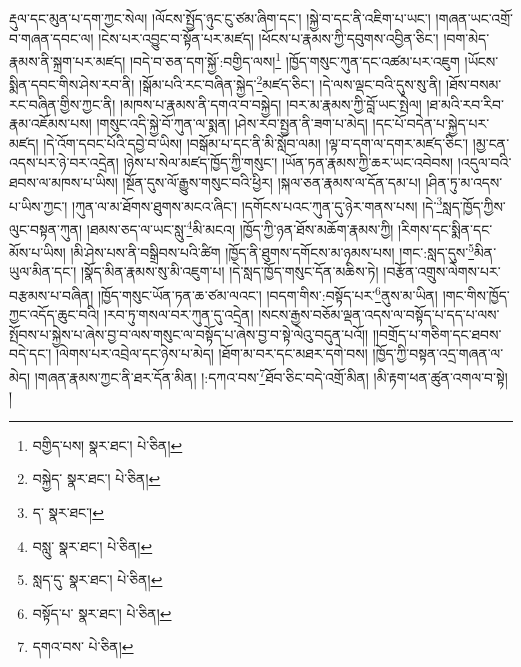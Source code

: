 རྡུལ་དང་མུན་པ་དག་ཀྱང་སེལ། །ལོངས་སྤྱོད་ཉུང་ངུ་ཙམ་ཞིག་དང་། །སྐྱེ་བ་དང་ནི་འཇིག་པ་ཡང་། །གཞན་ཡང་འགྲོ་བ་གཞན་དབང་ལ། །ངེས་པར་འབྱུང་བ་སྟོན་པར་མཛད། །ཕོངས་པ་རྣམས་ཀྱི་དབུགས་འབྱིན་ཅིང་། །བག་མེད་རྣམས་ནི་སྐྲག་པར་མཛད། །བདེ་བ་ཅན་དག་སྐྱོ་:བགྱིད་ལས།\footnote{བགྱིད་པས།  སྣར་ཐང་།  པེ་ཅིན། } །ཁྱོད་གསུང་ཀུན་དང་འཚམ་པར་འཇུག །ཡོངས་སྨིན་དབང་གིས་ཤེས་རབ་ནི། །སྒོམ་པའི་རང་བཞིན་སྐྱེད་\footnote{བསྐྱེད་  སྣར་ཐང་།  པེ་ཅིན། }མཛད་ཅིང་། །དེ་ལས་ལྡང་བའི་དུས་སུ་ནི། །ཐོས་བསམ་རང་བཞིན་གྱིས་ཀྱང་ནི། །མཁས་པ་རྣམས་ནི་དགའ་བ་བསྐྱེད། །བར་མ་རྣམས་ཀྱི་བློ་ཡང་སྤེལ། །ཐ་མའི་རབ་རིབ་རྣམ་འཇོམས་པས། །གསུང་འདི་སྐྱེ་བོ་ཀུན་ལ་སྨན། །ཤེས་རབ་སྤྱན་ནི་ཟག་པ་མེད། །དང་པོ་བདེན་པ་སྐྱེད་པར་མཛད། །དེ་འོག་དབང་པོའི་དབྱེ་བ་ཡིས། །བསྒོམ་པ་དང་ནི་མི་སློབ་ལམ། །ལྟ་བ་དག་ལ་དགར་མཛད་ཅིང་། །མྱ་ངན་འདས་པར་ཉེ་བར་འདྲེན། །ཉེས་པ་སེལ་མཛད་ཁྱོད་ཀྱི་གསུང་། །ཡོན་ཏན་རྣམས་ཀྱི་ཆར་ཡང་འབེབས། །འདུལ་བའི་ཐབས་ལ་མཁས་པ་ཡིས། །སྔོན་དུས་ལོ་རྒྱུས་གསུང་བའི་ཕྱིར། །སྐལ་ཅན་རྣམས་ལ་དོན་དམ་པ། །ཤིན་ཏུ་མ་འདས་པ་ཡིས་ཀྱང་། །ཀུན་ལ་མ་ཐོགས་ཐུགས་མངའ་ཞིང་། །དགོངས་པའང་ཀུན་དུ་ཉེར་གནས་པས། །དེ་\footnote{ད་  སྣར་ཐང་། }སླད་ཁྱོད་ཀྱིས་ལུང་བསྟན་ཀུན། །ཐམས་ཅད་ལ་ཡང་སླུ་\footnote{བསླུ་  སྣར་ཐང་།  པེ་ཅིན། }མི་མངའ། །ཁྱོད་ཀྱི་ཉན་ཐོས་མཆོག་རྣམས་ཀྱི། །རིགས་དང་སྨིན་དང་མོས་པ་ཡིས། །མི་ཤེས་པས་ནི་བསྒྲིབས་པའི་ཚིག །ཁྱོད་ནི་ཐུགས་དགོངས་མ་ཉམས་པས། །གང་:སླད་དུས་\footnote{སླད་དུ་  སྣར་ཐང་།  པེ་ཅིན། }མིན་ཡུལ་མིན་དང་། །སྣོད་མིན་རྣམས་སུ་མི་འཇུག་པ། །དེ་སླད་ཁྱོད་གསུང་དོན་མཆིས་ཏེ། །བརྩོན་འགྲུས་ལེགས་པར་བརྩམས་པ་བཞིན། །ཁྱོད་གསུང་ཡོན་ཏན་ཆ་ཙམ་ལའང་། །བདག་གིས་:བསྟོད་པར་\footnote{བསྟོད་པ་  སྣར་ཐང་།  པེ་ཅིན། }ནུས་མ་ཡིན། །གང་གིས་ཁྱོད་ཀྱང་འདོད་ཆུང་བའི། །རབ་ཏུ་གསལ་བར་ཀུན་དུ་འདྲེན། །སངས་རྒྱས་བཅོམ་ལྡན་འདས་ལ་བསྟོད་པ་དད་པ་ལས་སྤོབས་པ་སྐྱེས་པ་ཞེས་བྱ་བ་ལས་གསུང་ལ་བསྟོད་པ་ཞེས་བྱ་བ་སྟེ་ལེའུ་བདུན་པའོ།། །།བགྲོད་པ་གཅིག་དང་ཐབས་བདེ་དང་། །ལེགས་པར་འབྲེལ་དང་ཉེས་པ་མེད། །ཐོག་མ་བར་དང་མཐར་དགེ་བས། །ཁྱོད་ཀྱི་བསྟན་འདྲ་གཞན་ལ་མེད། །གཞན་རྣམས་ཀྱང་ནི་ཐར་དོན་མིན། །:དཀའ་བས་\footnote{དགའ་བས་  པེ་ཅིན། }ཐོབ་ཅིང་བདེ་འགྲོ་མིན། །མི་རྟག་ཕན་ཚུན་འགལ་བ་སྟེ། །
